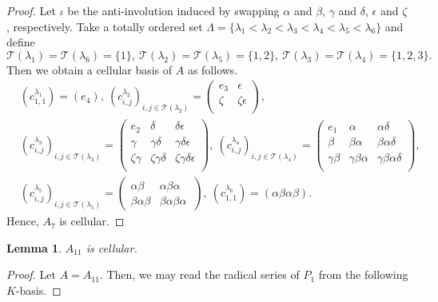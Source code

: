 \documentclass[12pt]{amsart}
\newtheorem{lem}[thm]{Lemma}
\numberwithin{equation}{thm}
\newcommand\cT{\mathcal{T}}
\newcommand\la{\lambda}
\begin{document}
{\begin{proof}
Let $\iota$ be the anti-involution induced by swapping $\alpha$ and $\beta$, 
$\gamma$ and $\delta$, $\epsilon$ and $\zeta$, respectively. Take a totally ordered set
 $\Lambda=
 \{\lambda_1<\lambda_2<\lambda_3<\lambda_4<\lambda_5<\lambda_6\}$ and define
\[\cT(\lambda_1)=\cT(\lambda_6)=\{1\},\ \cT(\lambda_2)=\cT(\lambda_5)=\{1,2\},\
\cT(\lambda_3)=\cT(\lambda_4)=\{1,2,3\}.\]
Then we obtain a cellular basis of $A$ as follows.
\begin{align*}
& (c_{1,1}^{\lambda_1})=(e_4),\  
  (c_{i,j}^{\lambda_2})_{i,j\in \cT(\la_2)}
    =\begin{pmatrix}
    e_3 & \epsilon \\
    \zeta & \zeta\epsilon \\
    \end{pmatrix},\\[7pt] 
& (c_{i,j}^{\lambda_3})_{i,j\in \cT(\la_3)}
    =\begin{pmatrix}
    e_2 & \delta & \delta\epsilon \\
    \gamma & \gamma\delta & \gamma\delta\epsilon \\
    \zeta\gamma & \zeta\gamma\delta & \zeta\gamma\delta\epsilon \\
    \end{pmatrix},\   
 (c_{i,j}^{\lambda_4})_{i,j\in \cT(\la_4)}
    =\begin{pmatrix}
    e_1 & \alpha & \alpha\delta \\
    \beta & \beta\alpha & \beta\alpha\delta \\
    \gamma\beta & \gamma\beta\alpha & \gamma\beta\alpha\delta \\
    \end{pmatrix},\\[9pt] 
& (c_{i,j}^{\lambda_5})_{i,j\in \cT(\la_5)}
    =\begin{pmatrix}
    \alpha\beta & \alpha\beta\alpha \\
    \beta\alpha\beta & \beta\alpha\beta\alpha \
    \end{pmatrix},\
 (c_{1,1}^{\lambda_6})=(\alpha\beta\alpha\beta).
 \end{align*}
Hence, $A_7$ is cellular.
 \end{proof}
\begin{lem}
\label{P A11}
$A_{11}$ is cellular.
\end{lem}
\begin{proof}
Let $A=A_{11}$. Then, we may read the radical series of $P_1$ from the following $K$-basis.

\end{proof}}
\end{document}

